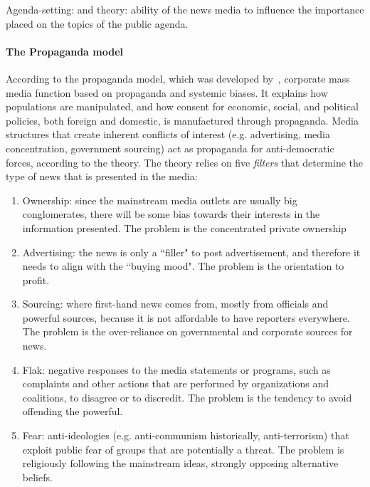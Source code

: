 Agenda-setting: \cite{Cohen_1964} and \cite{mccombs1972agenda} theory: ability of the news media to influence the importance placed on the topics of the public agenda.

\paragraph{The Propaganda model}

According to the propaganda model, which was developed by~\citet{herman1988manufacturing}, corporate mass media function based on propaganda and systemic biases. It explains how populations are manipulated, and how consent for economic, social, and political policies, both foreign and domestic, is manufactured through propaganda. Media structures that create inherent conflicts of interest (e.g. advertising, media concentration, government sourcing) act as propaganda for anti-democratic forces, according to the theory.
The theory relies on five \emph{filters} that determine the type of news that is presented in the media:

\begin{enumerate}
    \item Ownership: since the mainstream media outlets are usually big conglomerates, there will be some bias towards their interests in the information presented. The problem is the concentrated private ownership
    \item Advertising: the news is only a ``filler" to post advertisement, and therefore it needs to align with the ``buying mood". The problem is the orientation to profit.
    \item Sourcing: where first-hand news comes from, mostly from officials and powerful sources, because it is not affordable to have reporters everywhere. The problem is the over-reliance on governmental and corporate sources for news.
    \item Flak: negative responses to the media statements or programs, such as complaints and other actions that are performed by organizations and coalitions, to disagree or to discredit. The problem is the tendency to avoid offending the powerful.
    \item Fear: anti-ideologies (e.g. anti-communism historically, anti-terrorism) that exploit public fear of groups that are potentially a threat. The problem is religiously following the mainstream ideas, strongly opposing alternative beliefs.
\end{enumerate}

